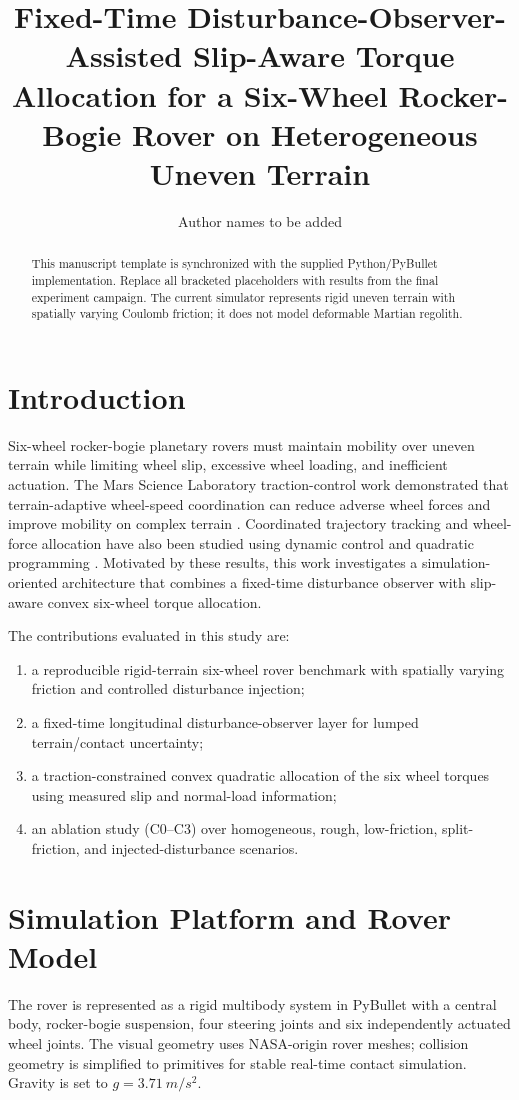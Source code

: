 \documentclass[11pt]{article}
\title{Fixed-Time Disturbance-Observer-Assisted Slip-Aware Torque Allocation for a Six-Wheel Rocker-Bogie Rover on Heterogeneous Uneven Terrain}
\author{Author names to be added}
\date{}
\begin{document}
\maketitle

\begin{abstract}
This manuscript template is synchronized with the supplied Python/PyBullet implementation. Replace all bracketed placeholders with results from the final experiment campaign. The current simulator represents rigid uneven terrain with spatially varying Coulomb friction; it does not model deformable Martian regolith.
\end{abstract}

\section{Introduction}
Six-wheel rocker-bogie planetary rovers must maintain mobility over uneven terrain while limiting wheel slip, excessive wheel loading, and inefficient actuation. The Mars Science Laboratory traction-control work demonstrated that terrain-adaptive wheel-speed coordination can reduce adverse wheel forces and improve mobility on complex terrain \cite{toupet2018traction,toupet2020terrain}. Coordinated trajectory tracking and wheel-force allocation have also been studied using dynamic control and quadratic programming \cite{chen2021simultaneous}. Motivated by these results, this work investigates a simulation-oriented architecture that combines a fixed-time disturbance observer with slip-aware convex six-wheel torque allocation.

The contributions evaluated in this study are:
\begin{enumerate}
\item a reproducible rigid-terrain six-wheel rover benchmark with spatially varying friction and controlled disturbance injection;
\item a fixed-time longitudinal disturbance-observer layer for lumped terrain/contact uncertainty;
\item a traction-constrained convex quadratic allocation of the six wheel torques using measured slip and normal-load information;
\item an ablation study (C0--C3) over homogeneous, rough, low-friction, split-friction, and injected-disturbance scenarios.
\end{enumerate}

\section{Simulation Platform and Rover Model}
The rover is represented as a rigid multibody system in PyBullet with a central body, rocker-bogie suspension, four steering joints and six independently actuated wheel joints. The visual geometry uses NASA-origin rover meshes; collision geometry is simplified to primitives for stable real-time contact simulation. Gravity is set to $g=\SI{3.71}{m/s^2}$.
\end{document}
